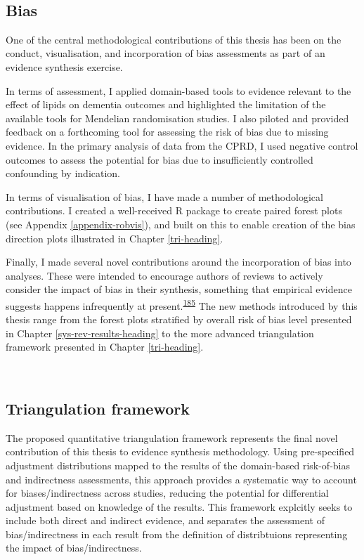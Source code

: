 \documentclass[a4paper, twoside]{templates/ociamthesis}
\begin{document}
~

\hypertarget{bias}{%
\subsection{Bias}\label{bias}}

One of the central methodological contributions of this thesis has been on the conduct, visualisation, and incorporation of bias assessments as part of an evidence synthesis exercise.

In terms of assessment, I applied domain-based tools to evidence relevant to the effect of lipids on dementia outcomes and highlighted the limitation of the available tools for Mendelian randomisation studies. I also piloted and provided feedback on a forthcoming tool for assessing the risk of bias due to missing evidence. In the primary analysis of data from the CPRD, I used negative control outcomes to assess the potential for bias due to insufficiently controlled confounding by indication.

In terms of visualisation of bias, I have made a number of methodological contributions. I created a well-received R package to create paired forest plots (see Appendix \ref{appendix-robvis}), and built on this to enable creation of the bias direction plots illustrated in Chapter \ref{tri-heading}.

Finally, I made several novel contributions around the incorporation of bias into analyses. These were intended to encourage authors of reviews to actively consider the impact of bias in their synthesis, something that empirical evidence suggests happens infrequently at present.\textsuperscript{\protect\hyperlink{ref-katikireddi2015}{185}} The new methods introduced by this thesis range from the forest plots stratified by overall risk of bias level presented in Chapter \ref{sys-rev-results-heading} to the more advanced triangulation framework presented in Chapter \ref{tri-heading}.

~

\hypertarget{triangulation-framework}{%
\subsection{Triangulation framework}\label{triangulation-framework}}

The proposed quantitative triangulation framework represents the final novel contribution of this thesis to evidence synthesis methodology. Using pre-specified adjustment distributions mapped to the results of the domain-based risk-of-bias and indirectness assessments, this approach provides a systematic way to account for biases/indirectness across studies, reducing the potential for differential adjustment based on knowledge of the results. This framework explcitly seeks to include both direct and indirect evidence, and separates the assessment of bias/indirectness in each result from the definition of distribtuions representing the impact of bias/indirectness.
\end{document}
